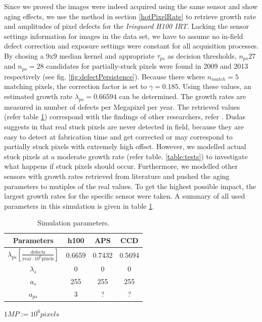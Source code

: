 \documentclass[10pt,twocolumn,letterpaper]{article}
\begin{document}
\vspace{-4mm}

Since we proved the images were indeed acquired using the same sensor and show aging effects, we use the method in section \ref{hotPixelRate} to retrieve growth rate and amplitudes of pixel defects for the \emph{Irisguard H100 IRT}. Lacking the sensor settings information for images in the data set, we have to assume no in-field defect correction \cite{inFieldDefects} and exposure settings were constant for all acquisition processes. By chosing a 9x9 median kernel and appropriate $\tau_{ps}$ as decision thresholds, $n_{ps}27$ and $n_{ps}=28$ candidates for partially-stuck pixels were found in 2009 and 2013 respectively (see fig. \ref{fig:defectPersistence}). Because there where $n_{match}=5$ matching pixels, the correction factor is set to $\gamma=0.185$. Using these values, an estimated growth rate $\lambda_{ps}=0.66594$ can be determined. The growth rates are measured in number of defects per Megapixel per year. The retrieved values (refer table \ref{table:parameters}) correspond with the findings of other researchers, refer \cite{defectDetection, leung}. Dudas suggests in \cite{inFieldDefects} that real stuck pixels are never detected in field, because they are easy to detect at fabrication time and get corrected or may correspond to partially stuck pixels with extremely high offset. However, we modelled actual stuck pixels at a moderate growth rate (refer table. \ref{table:tests}) to investigate what happens if stuck pixels should occur. Furthermore, we modelled other sensors with growth rates retrieved from literature and pushed the aging parameters to mutiples of the real values. To get the highest possible impact, the largest growth rates for the specific sensor were taken. A summary of all used parameters in this simulation is given in table \ref{table:parameters}.


 \bgroup
\def\arraystretch{1.3}%
 \begin{table} [hbt]
  \begin{center}
    \begin{tabular}{|c | c c c|}
    \hline 
    \textbf{Parameters} & h100  & APS \cite{leung} & CCD \cite{leung} \\
    \hline 
    $\lambda_{ps} [\frac{\text{defects}}{\text{year} \cdot 10^6 \text{pixels}}]$  & 0.6659 &  0.7432 & 0.5694 \\
    $\lambda_s$ 	&  0  & 0 & 0 \\
    $a_s$		&  255  & 255 & 255 \\
    $a_{ps}$	&  3  & ? & ? \\
    \hline  
    \end{tabular}

    \vspace{1mm}
    \hfill \tiny { $1MP := 10^6 pixels$}
     \vspace{-2mm}
    
    \caption{Simulation parameters. }
    \label{table:parameters}
  \end{center}
  \vspace{-5mm}
\end{table}
\end{document}
